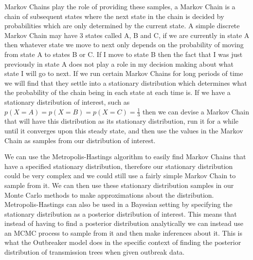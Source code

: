 \documentclass{amsbook}
\begin{document}
Markov Chains play the role of providing these samples, a Markov Chain is a chain of subsequent states where the next state in the chain is decided by probabilities which are only determined by the current state. A simple discrete Markov Chain may have 3 states called A, B and C, if we are currently in state A then whatever state we move to next only depends on the probability of moving from state A to states B or C. If I move to state B then the fact that I was just previously in state A does not play a role in my decision making about what state I will go to next. If we run certain Markov Chains for long periods of time we will find that they settle into a stationary distribution which determines what the probability of the chain being in each state at each time is. If we have a stationary distribution of interest, such as $p(X=A)=p(X=B)=p(X=C)=\frac{1}{3}$ then we can devise a Markov Chain that will have this distribution as its stationary distribution, run it for a while until it converges upon this steady state, and then use the values in the Markov Chain as samples from our distribution of interest.

We can use the Metropolis-Hastings algorithm to easily find Markov Chains that have a specified stationary distribution, therefore our stationary distribution could be very complex and we could still use a fairly simple Markov Chain to sample from it. We can then use these stationary distribution samples in our Monte Carlo methods to make approximations about the distribution. Metropolis-Hastings can also be used in a Bayesian setting by specifying the stationary distribution as a posterior distribution of interest. This means that instead of having to find a posterior distribution analytically we can instead use an MCMC process to sample from it and then make inferences about it. This is what the Outbreaker model does in the specific context of finding the posterior distribution of transmission trees when given outbreak data.
\end{document}
